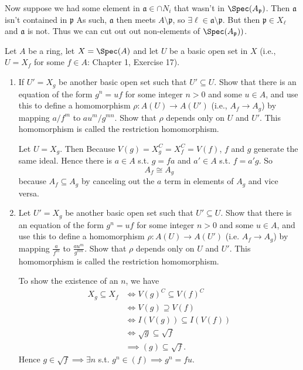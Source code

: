 \documentclass[a4paper]{exam}
\begin{document}
\begin{questions}
\begin{solution}
	Now suppose we had some element in $\mathfrak{a} \in \cap N_i $ that wasn't in $\Spec(A_{\mathfrak{p}}) $.
	Then $\mathfrak{a} $ isn't contained in $\mathfrak{p} $
	As such, $\mathfrak{a} $ then meets $A \setminus \mathfrak{p} $, so $\exists \ell \in \mathfrak{a} \setminus \mathfrak{p} $.
	But then $\mathfrak{p} \in X_{\ell} $ and $\mathfrak{a} $ is not.
	Thus we can cut out out non-elements of $\Spec(A_{\mathfrak{p}})) $.
\end{solution}

\question Let $A $ be a ring, let $X = \Spec(A) $ and let $U$ be a basic open set in $X $ (i.e., $U = X_f $ for some $f \in A $: Chapter 1, Exercise 17).
\begin{enumerate}
\item If $U' = X_g $ be another basic open set such that $U' \subseteq U $. Show that there is an equation of the form $g^n = uf $ for some integer $n>0 $ and some $u \in A $, and use this to define a homomorphism $\rho: A(U) \to A(U') $ (i.e., $A_f \to A_g $) by mapping $a / f^m $ to $au^m / g^{mn}  $. Show that $\rho $ depends only on $U $ and $U' $. This homomorphism is called the restriction homomorphism.
\begin{solution}
	Let $U = X_g $.
	Then Because $V(g) = X_g^C = X_f^C = V(f) $, $f $ and $g $ generate the same ideal.
	Hence there is $a\in A $ s.t. $g = fa $ and $a' \in A $ s.t. $f = a'g $.
	So
	\[
		A_{f} \cong A_{g}
	\] 
	because $A_f \subseteq A_g $ by canceling out the $a $ term in elements of $A_g $ and vice versa.
\end{solution}
\item Let $U' = X_g $ be another basic open set such that $U' \subseteq U $. Show that there is an equation of the form $g^n = uf $ for some integer $n > 0 $ and some $u\in A $, and use this to define a homomorphism $\rho: A(U) \to A(U') $ (i.e. $A_f \to A_g $) by mapping $\frac{a}{f^m} $ to $\frac{au^m}{g^{mn} } $. Show that $\rho $ depends only on $U $ and $U' $. This homomorphism is called the restriction homomorphism.
\begin{solution}
	To show the existence of an $n $, we have
	\begin{align*}
		X_g \subseteq X_f &\iff V(g)^C \subseteq V(f)^C\\
				  &\iff V(g) \supseteq V(f)\\
				  &\iff I(V(g)) \subseteq I(V(f))\\
				  &\iff \sqrt{g}  \subseteq \sqrt{f}  \tag{Nullstellensatz}\\
				  &\implies (g) \subseteq \sqrt{f} 
	.\end{align*}
	Hence $g\in \sqrt{f}  \implies \exists n$ s.t. $g^n \in (f) \implies g^n = fu $.


\end{solution}
\end{enumerate}
\end{questions}
\end{document}
